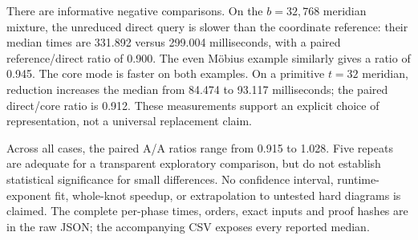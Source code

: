 There are informative negative comparisons. On the $b=32,768$ meridian
mixture, the unreduced direct query is slower than the coordinate reference:
their median times are 331.892 versus 299.004 milliseconds, with a paired
reference/direct ratio of 0.900. The even M\"obius example similarly gives
a ratio of 0.945. The core mode is faster on both examples. On a primitive
$t=32$ meridian, reduction increases the median from 84.474 to 93.117
milliseconds; the paired direct/core ratio is 0.912. These measurements
support an explicit choice of representation, not a universal replacement
claim.

Across all cases, the paired A/A ratios range from 0.915 to 1.028. Five repeats are adequate for a transparent exploratory comparison, but do not establish statistical significance for small differences. No confidence interval, runtime-exponent fit, whole-knot speedup, or extrapolation to untested hard diagrams is claimed. The complete per-phase times, orders, exact inputs and proof hashes are in the raw JSON; the accompanying CSV exposes every reported median.

